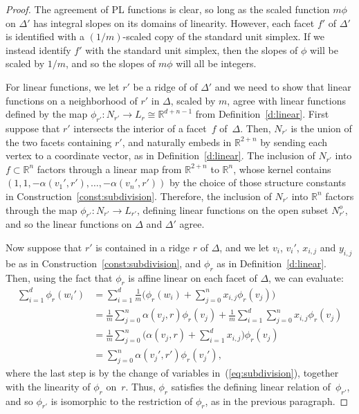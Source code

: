 \documentclass[11pt]{amsart}
\theoremstyle{definition}
\newcommand{\isom}{\cong}
\newcommand{\RR}{\mathbb R}
\begin{document}
\begin{proof}
The agreement of PL functions is clear, so long as the scaled function $m\phi$
on $\Delta'$ has integral slopes on its domains of linearity. However, each
facet $f'$ of $\Delta'$ is identified with a $(1/m)$-scaled copy of the standard
unit simplex. If we instead identify $f'$ with the standard unit simplex, then
the slopes of $\phi$ will be scaled by $1/m$, and so the slopes of $m\phi$ will
all be integers.

For linear functions, we let $r'$ be a ridge of of $\Delta'$ and we need to show
that linear functions on a neighborhood of $r'$ in $\Delta$, scaled by $m$,
agree with linear functions defined by the map $\phi_{r'} \colon N_{r'}
\rightarrow L_r \isom \RR^{d+n-1}$ from Definition~\ref{d:linear}. First suppose
that $r'$ intersects the interior of a facet~$f$ of~$\Delta$. Then, $N_{r'}$ is
the union of the two facets containing $r'$, and naturally embeds in $\RR^{2+n}$
by sending each vertex to a coordinate vector, as in Definition~\ref{d:linear}.
The inclusion of $N_{r'}$ into $f \subset \RR^n$ factors through a linear map
from $\RR^{2+n}$ to $\RR^n$, whose kernel contains $(1, 1, -\alpha(v_1', r'),
\ldots, -\alpha(v_n', r'))$ by the choice of those structure constants in
Construction~\ref{const:subdivision}. Therefore, the inclusion of $N_{r'}$ into
$\RR^n$ factors through the map $\phi_{r'} \colon N_{r'} \rightarrow L_{r'}$,
defining linear functions on the open subset $N_{r'}^o$, and so the linear
functions on $\Delta$ and $\Delta'$ agree.

Now suppose that $r'$ is contained in a ridge $r$ of $\Delta$, and
we let $v_i$, $v_i'$, $x_{i,j}$ and $y_{i,j}$ be as
in Construction~\ref{const:subdivision}, and $\phi_r$ as in
Definition~\ref{d:linear}. Then, using the fact that $\phi_r$ is affine linear
on each facet of $\Delta$, we can evaluate:
\begin{align*}
\sum_{i=1}^d \phi_r(w_i') &=
\sum_{i=1}^d \frac{1}{m} \Bigg(\phi_r(w_i) + \sum_{j = 0}^n x_{i,j}
\phi_r(v_j)\Bigg) \\
&= \frac{1}{m}\sum_{j=0}^n \alpha(v_j, r) \phi_r(v_j) +
\frac{1}{m}\sum_{i=1}^d\sum_{j=0}^n x_{i,j}\phi_r(v_j) \\
&= \frac{1}{m} \sum_{j=0}^n \Bigg(\alpha(v_j, r) + \sum_{i=1}^d x_{i,j} \Bigg)
\phi_r(v_j) \\
&= \sum_{j=0}^n \alpha(v_j', r') \phi_r(v_{j}'),
\end{align*}
where the last step is by the change of variables in~(\ref{eq:subdivision}),
together with the linearity of $\phi_r$ on~$r$. Thus, $\phi_r$ satisfies
the defining linear relation of~$\phi_{r'}$, and so $\phi_{r'}$ is isomorphic to
the restriction of $\phi_r$, as in the previous paragraph.
\end{proof}
\end{document}
